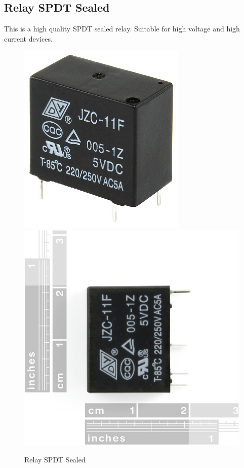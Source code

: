 \documentclass[12pt,a4paper,draft]{report}
\begin{document}
\subsection{Relay SPDT Sealed}
This is a high quality SPDT sealed relay. Suitable for high voltage and high current devices. \cite{website:relay}
\ \\
\begin{figure}[H]
\centering
    \includegraphics*[scale=0.5]{realy}
    \includegraphics*[scale=0.2]{relay_2}
    \caption{Relay SPDT Sealed}
\end{figure}
\end{document}
